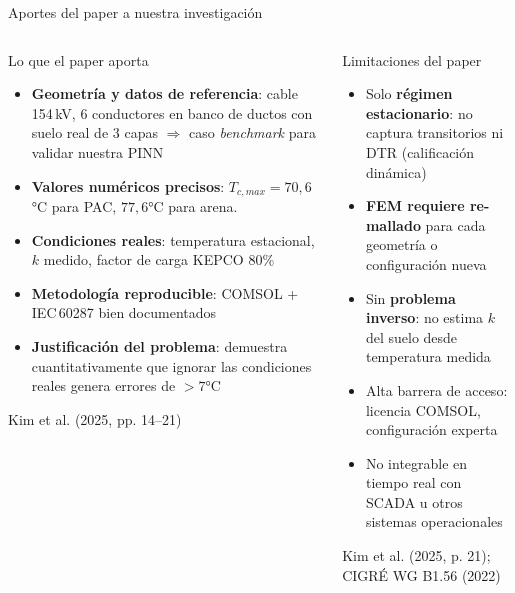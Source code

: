 \documentclass[aspectratio=169]{beamer}
\newcommand{\refcite}[1]{{\footnotesize\color{gray!70!black} #1}}
\begin{document}
\begin{frame}{Aportes del paper a nuestra investigación}
\begin{columns}[T]
\begin{exampleblock}{Lo que el paper aporta}
\small\justifying
\begin{itemize}[leftmargin=*, itemsep=3pt]
  \item \textbf{Geometría y datos de referencia}: cable 154\,kV, 6
        conductores en banco de ductos con suelo real de 3 capas
        $\Rightarrow$ caso \textit{benchmark} para validar nuestra PINN
  \item \textbf{Valores numéricos precisos}: $T_{c,max}=70{,}6$°C para
        PAC, $77{,}6$°C para arena.
  \item \textbf{Condiciones reales}: temperatura estacional, $k$ medido,
        factor de carga KEPCO 80\%
  \item \textbf{Metodología reproducible}: COMSOL + IEC\,60287 bien
        documentados
  \item \textbf{Justificación del problema}: demuestra cuantitativamente
        que ignorar las condiciones reales genera errores de $>7$°C
\end{itemize}
\refcite{Kim et al. (2025, pp. 14--21)}
\end{exampleblock}

\begin{alertblock}{Limitaciones del paper}
\small\justifying
\begin{itemize}[leftmargin=*, itemsep=3pt]
  \item Solo \textbf{régimen estacionario}: no captura transitorios ni
        DTR (calificación dinámica)
  \item \textbf{FEM requiere re-mallado} para cada geometría o
        configuración nueva
  \item Sin \textbf{problema inverso}: no estima $k$ del suelo desde
        temperatura medida
  \item Alta barrera de acceso: licencia COMSOL, configuración experta
  \item No integrable en tiempo real con SCADA u otros sistemas
        operacionales
\end{itemize}
\refcite{Kim et al. (2025, p. 21); CIGRÉ WG B1.56 (2022)}
\end{alertblock}
\end{columns}
\end{frame}
\end{document}
